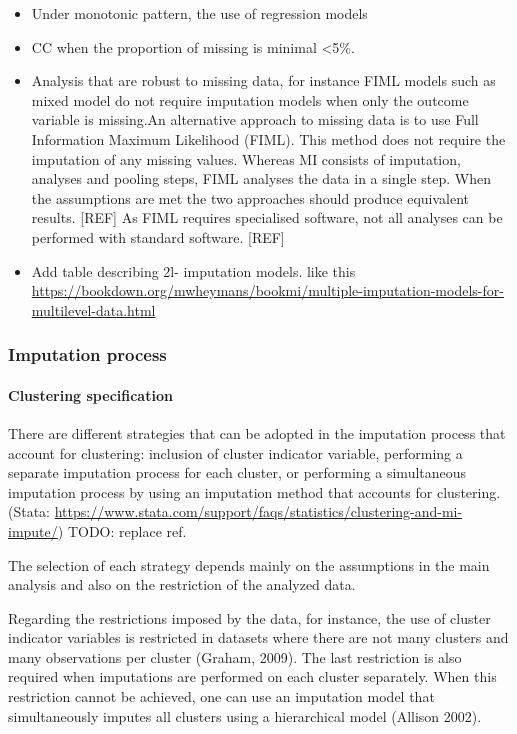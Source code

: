 \documentclass[
]{jss}
\begin{document}
\begin{itemize}
\item
  Under monotonic pattern, the use of regression models
\item
  CC when the proportion of missing is minimal \textless5\%.
\item
  Analysis that are robust to missing data, for instance FIML models
  such as mixed model do not require imputation models when only the
  outcome variable is missing.An alternative approach to missing data is
  to use Full Information Maximum Likelihood (FIML). This method does
  not require the imputation of any missing values. Whereas MI consists
  of imputation, analyses and pooling steps, FIML analyses the data in a
  single step. When the assumptions are met the two approaches should
  produce equivalent results. {[}REF{]} As FIML requires specialised
  software, not all analyses can be performed with standard software.
  {[}REF{]}
\item
  Add table describing 2l- imputation models. like this
  \url{https://bookdown.org/mwheymans/bookmi/multiple-imputation-models-for-multilevel-data.html}
\end{itemize}

\hypertarget{imputation-process}{%
\subsubsection{Imputation process}\label{imputation-process}}

\hypertarget{clustering-specification}{%
\paragraph{Clustering specification}\label{clustering-specification}}

There are different strategies that can be adopted in the imputation
process that account for clustering: inclusion of cluster indicator
variable, performing a separate imputation process for each cluster, or
performing a simultaneous imputation process by using an imputation
method that accounts for clustering.(Stata:
\url{https://www.stata.com/support/faqs/statistics/clustering-and-mi-impute/})
TODO: replace ref.

The selection of each strategy depends mainly on the assumptions in the
main analysis and also on the restriction of the analyzed data.

Regarding the restrictions imposed by the data, for instance, the use of
cluster indicator variables is restricted in datasets where there are
not many clusters and many observations per cluster (Graham, 2009). The
last restriction is also required when imputations are performed on each
cluster separately. When this restriction cannot be achieved, one can
use an imputation model that simultaneously imputes all clusters using a
hierarchical model (Allison 2002).
\end{document}
